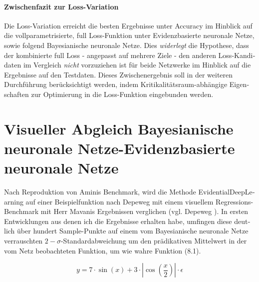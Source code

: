 \begin{otherlanguage}{ngerman}
\paragraph{Zwischenfazit zur Loss-Variation} Die Loss-Variation erreicht die besten Ergebnisse unter Accuracy im Hinblick auf die \glqq{}vollparametrisierte\grqq{}, \glqq{}full\grqq{} Loss-Funktion unter \gls{Evidenzbasierte neuronale Netze}, sowie folgend \gls{Bayesianische neuronale Netze}. Dies \textit{widerlegt} die Hypothese, dass der kombinierte \glqq{}full\grqq{} Loss - angepasst auf mehrere Ziele - den anderen Loss-Kandidaten im Vergleich \textit{nicht} vorzuziehen ist für beide Netzwerke im Hinblick auf die Ergebnisse auf den Testdaten. Dieses Zwischenergebnis soll in der weiteren Durchführung berücksichtigt werden, indem Kritikalitätsraum-abhängige Eigenschaften zur Optimierung in die Loss-Funktion eingebunden werden.



\section*{Visueller Abgleich \gls{Bayesianische neuronale Netze}-\gls{Evidenzbasierte neuronale Netze}}

Nach Reproduktion von Aminis Benchmark, wird die Methode \gls{EvidentialDeepLearning} auf einer Beispielfunktion nach Depeweg mit einem visuellem Regressions-Benchmark mit Herr Mavanis Ergebnissen verglichen (vgl. Depeweg \parencite[S.56, (4.1)]{Depeweg2019}). In ersten Entwicklungen aus denen ich die Ergebnisse erhalten habe, umfingen diese deutlich über hundert Sample-Punkte auf einem vom \gls{Bayesianische neuronale Netze} verrauschten $2-\sigma$-Standardabweichung um den prädikativen Mittelwert in der vom Netz beobachteten Funktion, um wie wahre Funktion (8.1).

\begin{equation}
y = 7 \cdot \sin(x) + 3 \cdot \left| \cos\left( \frac{x}{2} \right) \right| \cdot \epsilon
\end{equation}


\end{otherlanguage}
